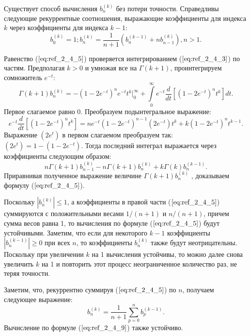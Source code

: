 Существует способ вычисления $b_n^{(k)}$ без потери точности. Справедливы
следующие рекуррентные соотношения, выражающие коэффициенты для
индекса $k$ через коэффициенты для индекса $k-1$:
\begin{equation}
b_0^{(k)}=1;b_n^{(k)}=\frac{1}{n+1}(b_n^{(k-1)}+nb_{n-1}^{(k)}),n>1.
\label{eq:ref_2_4_5}
\end{equation}

Равенство ($\ref{eq:ref_2_4_5}$) проверяется интегрированием ($\ref{eq:ref_2_4_3}$) по частям. Предполагая
$k > 0$ и умножая все на $\Gamma(k + 1)$, проинтегрируем сомножитель $e^{-t}$:
\begin{equation}
\Gamma(k+1)b_n^{(k)}=-(1-2e^{-t})^ne^{-t}t^k\Big|_0^{\infty} + \int\limits_0^{\infty} e^{-t}\frac{d}{dt}[(1-2e^{-t})^nt^k]dt.
\label{eq:ref_2_4_6} 
\end{equation}
Первое слагаемое равно 0. Преобразуем подынтегральное выражение:
\begin{equation}
 e^{-t}\frac{d}{dt}[(1-2e^{-t})^nt^k]=ne^{-t}(1-2e^{-t})^{n-1}(2e^{-t})t^k+k(1-2e^{-t})^nt^{k-1}.
\label{eq:ref_2_4_7}
\end{equation}
Выражение $(2e^{t})$  в первом слагаемом преобразуем так: $(2e^{t})= 1-(1-2e^{-t})$.
Тогда последний интеграл выражается через коэффициенты следующим
образом:
\begin{equation}
n\Gamma(k+1)b_{n-1}^{(k)}-n\Gamma(k+1)b_n^{(k)}+k\Gamma(k)b_n^{(k-1)}.
\label{eq:ref_2_4_8}
\end{equation}
Приравнивая полученное выражение величине $\Gamma{(k+1)}b_n^{(k)}$ , доказываем формулу ($\ref{eq:ref_2_4_5}$).

Поскольку $|b_n^{(k)}| \leqslant 1$, а коэффициенты в правой части ($\ref{eq:ref_2_4_5}$) суммируются с
положительными весами $1/(n + 1)$ и $n/(n + 1)$, причем сумма весов равна 1, то
вычисления по формуле ($\ref{eq:ref_2_4_5}$) будут устойчивыми. Заметим, что если для
некоторого $k - 1$ коэффициенты $|b_n^{(k-1)}| \geqslant 0$ при всех $n$, то коэффициенты $b_n^{(k)}$ также будут неотрицательны. Поскольку при увеличении $k$ на 1 вычисления
устойчивы, то можно далее снова увеличить $k$ на 1 и повторить этот процесс
неограниченное количество раз, не теряя точности.

Заметим, что, рекуррентно суммируя ($\ref{eq:ref_2_4_5}$) по $n$, получаем следующее выражение:
\begin{equation}
b_n^{(k)}=\frac{1}{n+1}\sum\limits_{p=0}^n b_p^{(k-1)}.
\label{eq:ref_2_4_9}
\end{equation}
Вычисление по формуле ($\ref{eq:ref_2_4_9}$) также устойчиво.


